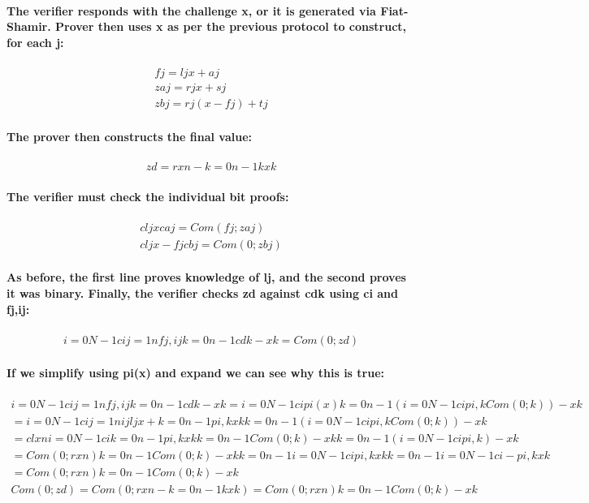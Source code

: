 \documentclass{article}
\begin{document}
\paragraph{The verifier responds with the challenge x, or it is generated via Fiat-Shamir.  Prover then uses x as per the previous protocol to construct, for each j:}

\begin{eqnarray}
  fj=ljx+aj\\
  zaj=rjx+sj\\
  zbj=rj(x-fj)+tj
\end{eqnarray}

\paragraph{The prover then constructs the final value:}

\begin{eqnarray}
  zd=rxn-k=0n-1kxk
\end{eqnarray}

\paragraph{The verifier must check the individual bit proofs:}

\begin{eqnarray}
  cljx caj=Com(fj;zaj)\\
  cljx-fjcbj=Com(0;zbj)
\end{eqnarray}
    
\paragraph{As before, the first line proves knowledge of lj, and the second proves it was binary.  Finally, the verifier checks zd against cdk using ci and fj,ij:}

\begin{eqnarray}
  i=0N-1cij=1nfj,ij  k=0n-1cdk-xk=Com(0;zd)
\end{eqnarray}

\paragraph{If we simplify using pi(x) and expand we can see why this is true:}

\begin{eqnarray}
  i=0N-1cij=1nfj,ij  k=0n-1cdk-xk=i=0N-1cipi(x)  k=0n-1 (i=0N-1cipi,k Com(0;k))-xk\\
  =i=0N-1cij=1nijljx+ k=0n-1pi,k xk  k=0n-1 (i=0N-1cipi,k Com(0;k))-xk\\
  =clxn i=0N-1cik=0n-1pi,k xk  k=0n-1Com(0;k)-xk k=0n-1(i=0N-1cipi,k)-xk\\
  =Com(0;rxn) k=0n-1Com(0;k)-xk  k=0n-1i=0N-1cipi,k xk  k=0n-1i=0N-1ci-pi,kxk\\
  =Com(0;rxn) k=0n-1Com(0;k)-xk\\
  Com(0;zd)=Com(0;rxn-k=0n-1kxk)=Com(0;rxn) k=0n-1Com(0;k)-xk
\end{eqnarray}
\end{document}
